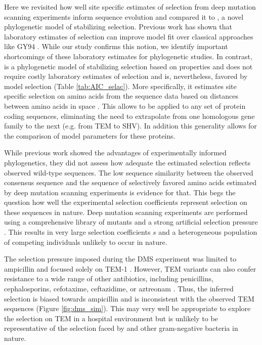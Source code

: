 Here we revisited how well site specific estimates of selection from deep mutation scanning experiments inform sequence evolution and compared it to \selac, a novel phylogenetic model of stabilizing selection.
Previous work has shown that laboratory estimates of selection can improve model fit over classical approaches like GY94 \citep{bloom2014, bloom2017}.
While our study confirms this notion, we identify important shortcomings of these laboratory estimates for phylogenetic studies.
In contrast, \selac is a phylogenetic model of stabilizing selection based on \PC properties and does not require costly laboratory estimates of selection and is, nevertheless, favored by model selection (Table \ref{tab:AIC_selac}).
More specifically, it estimates site specific selection on amino acids from the sequence data based on distances between amino acids in \PC space \citep{grantham1974,beaulieu2019}.
This allows \selac to be applied to any set of protein coding sequences, eliminating the need to extrapolate from one homologous gene family to the next (e.g. from TEM to SHV).
In addition this generality allows for the comparison of model parameters for these proteins.

While previous work showed the advantages of experimentally informed phylogenetics, they did not assess how adequate the estimated selection reflects observed wild-type sequences.
The low sequence similarity between the observed consensus sequence and the sequence of selectively favored amino acids estimated by deep mutation scanning experiments is evidence for that.
This begs the question how well the experimental selection coefficients represent selection on these sequences in nature.
Deep mutation scanning experiments are performed using a comprehensive library of mutants and a strong artificial selection pressure \citep{FirnbergAndOstermeier2012, Jain2014, FowlerAndFields2014, Fowler2014}.
This results in  very large selection coefficients $s$ and a heterogeneous population of competing individuals unlikely to occur in nature.

The selection pressure imposed during the DMS experiment was limited to ampicillin and focused solely on TEM-1 \citep{stiffler2016}.
However, TEM variants can also confer resistance to a wide range of other antibiotics, including penicillins, cephalosporins, cefotaxime, ceftazidime, or aztreonam \citep{sougakoff1988,sougakoff1989,goussard1991,mabilat1992,chanal1992,brun1994}.
Thus, the inferred selection is biased towards ampicillin and is inconsistent with the observed TEM sequences (Figure \ref{fig:dms_sim}).
This may very well be appropriate to explore the selection on TEM in a hospital environment but is unlikely to be representative of the selection faced by \ecoli and other gram-negative bacteria in nature.

